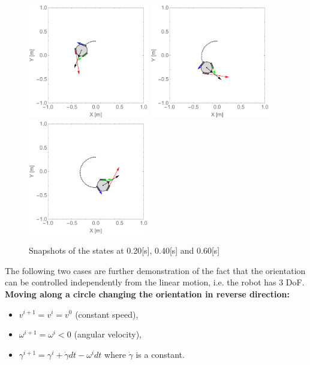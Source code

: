 \documentclass[12pt,english,twoside]{article}
\begin{document}
\begin{figure}[htb!]
	\centering
	\includegraphics[height=5cm]{figures/2d_simulation/animations2/2D_move_along_circle_rotating_car_like/20}
	\endminipage\hfill
	\centering
	\includegraphics[height=5cm]{figures/2d_simulation/animations2/2D_move_along_circle_rotating_car_like/40}
	\endminipage\hfill
	\centering
	\includegraphics[height=5cm]{figures/2d_simulation/animations2/2D_move_along_circle_rotating_car_like/60}
	\endminipage\hfill
	\caption{Snapshots of the states at 0.20[s], 0.40[s] and 0.60[s]}
\end{figure}
\newpage
The following two cases are further demonstration of the fact that the orientation can be controlled independently from the linear motion, i.e. the robot has 3 DoF. \\[0.3cm]
\noindent \textbf{Moving along a circle changing the orientation in reverse direction:}
\begin{itemize}
	\item $v^{i+1} = v^{i} = v^{0}$ (constant speed),
	\item $\omega^{i+1} = \omega^{i}<0$ (angular velocity),
	\item $\gamma^{i+1} = \gamma^i + \dot \gamma dt -\omega^i dt$ where $\dot \gamma$ is a constant.
\end{itemize}
\end{document}
